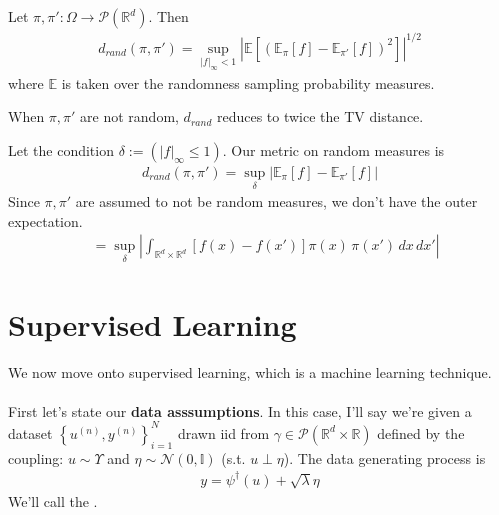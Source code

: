 \documentclass[11pt,fleqn]{article}
\numberwithin{equation}{section}
\theoremstyle{definition}
\theoremstyle{definition}
\renewenvironment{proof}[1][\proofname]{\vspace{-10pt}\begin{replacementproof}}{\end{replacementproof}}
\begin{document}
\begin{definition}
	Let $\pi, \pi' : \Omega \to \mathcal P(\mathbb R^d)$. Then
	\begin{align}
		d_{rand}(\pi, \pi') = \sup_{|f|_{\infty} < 1} \left | \mathbb E \left[  \left( \mathbb E_\pi[f] - \mathbb E_{\pi'}[f] \right)^2 \right] \right |^{1/2}
	\end{align}
	where $\mathbb E$ is taken over the randomness sampling probability measures.
\end{definition}
\begin{remark}
	When $\pi,\pi'$ are not random, $d_{rand}$ reduces to twice the TV distance.
\end{remark}
\begin{proof}
	Let the condition $\delta := (|f|_{\infty} \leq 1)$. Our metric on random measures is
	\begin{align}
		d_{rand}(\pi, \pi') = \sup_{\delta} \left | \mathbb E_{\pi}[f] - \mathbb E_{\pi'}[f]  \right |
	\end{align}
	Since $\pi, \pi'$ are assumed to not be random measures, we don't have the outer expectation.
	\begin{align}
		& = \sup_{\delta} \left | \int_{\mathbb R^d \times \mathbb R^d} [f(x) - f(x') ] \pi(x) \, \pi(x') \, dx \, dx'\right |
	\end{align}
\end{proof}



\section{Supervised Learning}
We now move onto supervised learning, which is a machine learning technique. \\
\\
First let's state our \textbf{data asssumptions}. In this case, I'll say we're given a dataset $\left\{ u^{(n)}, y^{(n)} \right\}_{i=1}^N$ drawn iid from $\gamma \in \mathcal P(\mathbb R^d \times \mathbb R)$ defined by the coupling: $u \sim \Upsilon$ and $\eta \sim \mathcal N(0, \mathbb I)$ (s.t. $u \perp \eta$). The data generating process is
\begin{align}
	y = \psi^\dagger(u) + \sqrt{\lambda} \eta
\end{align}
We'll call the .
\end{document}
